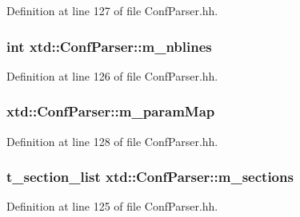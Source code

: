 Definition at line 127 of file Conf\+Parser.\+hh.

\subsubsection[{\texorpdfstring{m\+\_\+nblines}{m_nblines}}]{\setlength{\rightskip}{0pt plus 5cm}int xtd\+::\+Conf\+Parser\+::m\+\_\+nblines\hspace{0.3cm}{\ttfamily [protected]}}\hypertarget{classxtd_1_1ConfParser_a5203f3b8cb6e9070b33371c9acabbc8c}{}\label{classxtd_1_1ConfParser_a5203f3b8cb6e9070b33371c9acabbc8c}


Definition at line 126 of file Conf\+Parser.\+hh.

\subsubsection[{\texorpdfstring{m\+\_\+param\+Map}{m_paramMap}}]{ xtd\+::\+Conf\+Parser\+::m\+\_\+param\+Map\hspace{0.3cm}{\ttfamily [protected]}}\hypertarget{classxtd_1_1ConfParser_abe309999c7964603bde870c7bda16d2e}{}\label{classxtd_1_1ConfParser_abe309999c7964603bde870c7bda16d2e}


Definition at line 128 of file Conf\+Parser.\+hh.

\subsubsection[{\texorpdfstring{m\+\_\+sections}{m_sections}}]{\setlength{\rightskip}{0pt plus 5cm}t\+\_\+section\+\_\+list xtd\+::\+Conf\+Parser\+::m\+\_\+sections\hspace{0.3cm}{\ttfamily [protected]}}\hypertarget{classxtd_1_1ConfParser_a100cffb5f33795e50c87ab5fb2a43963}{}\label{classxtd_1_1ConfParser_a100cffb5f33795e50c87ab5fb2a43963}


Definition at line 125 of file Conf\+Parser.\+hh.

